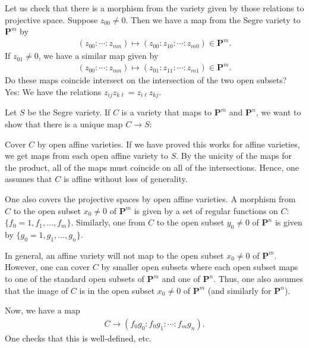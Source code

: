 \documentclass [11 pt, oneside, margin = 1 in] {article}
\begin{document}
Let us check that there is a morphism from the variety given by those relations to projective space. Suppose $z_{00}\ne 0$. Then we have a map from the Segre variety to $\mathbf{P}^m$ by
\begin{align*}
(z_{00}:\cdots:z_{mn})\longmapsto (z_{00}:z_{10}:\cdots:z_{m0})\in \mathbf{P}^m.	
\end{align*}
If $z_{01}\ne 0$, we have a similar map given by
\begin{align*}
	(z_{00}:\cdots:z_{mn})\longmapsto (z_{01}:z_{11}:\cdots:z_{m1})\in \mathbf{P}^m.
\end{align*}
Do these maps coincide intersect on the intersection of the two open subsets? Yes: We have the relations $z_{ij}z_{k\ell} = z_{i\ell}z_{kj}$. 

Let $S$ be the Segre variety. If $C$ is a variety that maps to $\mathbf{P}^m$ and $\mathbf{P}^n$, we want to show that there is a unique map $C\longrightarrow S$:
\begin{center}
\end{center}
Cover $C$ by open affine varieties. If we have proved this works for affine varieties, we get maps from each open affine variety to $S$. By the unicity of the maps for the product, all of the maps must coincide on all of the intersections. Hence, one assumes that $C$ is affine without loss of generality.

One also covers the projective spaces by open affine varieties. A morphism from $C$ to the open subset $x_0\ne 0$ of $\mathbf{P}^m$ is given by a set of regular functions on $C$: $\{f_0=1,f_1,\hdots, f_m\}$. Similarly, one from $C$ to the open subset $y_0\ne 0$ of $\mathbf{P}^n$ is given by $\{g_0=1,g_1,\hdots, g_n\}$. 

In general, an affine variety will not map to the open subset $x_0\ne 0$ of $\mathbf{P}^m$. However, one can cover $C$ by smaller open subsets where each open subset maps to one of the standard open subsets of $\mathbf{P}^m$ and one of $\mathbf{P}^n$. Thus, one also assumes that the image of $C$ is in the open subset $x_0\ne 0$ of $\mathbf{P}^m$ (and similarly for $\mathbf{P}^n$).

Now, we have a map 
\begin{align*}
	C\longrightarrow (f_0g_0:f_0g_1:\cdots:f_mg_n).
\end{align*}
One checks that this is well-defined, etc.
\end{document}
